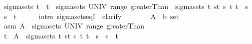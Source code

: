 \begin{isabellebody}
\ {\isachardoublequoteopen}sigma{\isacharunderscore}{\kern0pt}sets\ {\isacharbraceleft}{\kern0pt}t\ {\isacharparenleft}{\kern0pt}{\isacharparenleft}{\kern0pt}{\isasyminter}{\isacharparenright}{\kern0pt}\ {\isacharbraceleft}{\kern0pt}t\ {\isacharbackquote}{\kern0pt}\ sigma{\isacharunderscore}{\kern0pt}sets\ UNIV\ {\isacharparenleft}{\kern0pt}range\ greaterThan{\isacharparenright}{\kern0pt}{\isacharparenright}{\kern0pt}\ {\isacharequal}{\kern0pt}\ sigma{\isacharunderscore}{\kern0pt}sets\ {\isacharbraceleft}{\kern0pt}t\ {\isacharbraceleft}{\kern0pt}{\isacharbraceleft}{\kern0pt}s{\isacharless}{\kern0pt}{\isachardot}{\kern0pt}{\isachardot}{\kern0pt}t{\isacharbraceright}{\kern0pt}\ {\isacharbar}{\kern0pt}s\ t{\isachardot}{\kern0pt}\ t\ {\isasymle}\ s\ {\isasymand}\ s\ {\isacharless}{\kern0pt}\ t{\isacharbraceright}{\kern0pt}{\isachardoublequoteclose}\isanewline
\ \ \ \ \isamarkupfalse%
\ {\isacharparenleft}{\kern0pt}intro\ sigma{\isacharunderscore}{\kern0pt}sets{\isacharunderscore}{\kern0pt}eqI\ {\isacharsemicolon}{\kern0pt}\ clarify{\isacharparenright}{\kern0pt}\isanewline
\ \ \ \ \ \ \isamarkupfalse%
\ A\ {\isacharcolon}{\kern0pt}{\isacharcolon}{\kern0pt}\ {\isachardoublequoteopen}{\isacharprime}{\kern0pt}b\ set{\isachardoublequoteclose}\ \isamarkupfalse%
\ asm{\isacharcolon}{\kern0pt}\ {\isachardoublequoteopen}A\ {\isasymin}\ sigma{\isacharunderscore}{\kern0pt}sets\ UNIV\ {\isacharparenleft}{\kern0pt}range\ greaterThan{\isacharparenright}{\kern0pt}{\isachardoublequoteclose}\isanewline
\ \ \ \ \ \ \isamarkupfalse%
\ {\isachardoublequoteopen}{\isacharbraceleft}{\kern0pt}t\ {\isasyminter}\ A\ {\isasymin}\ sigma{\isacharunderscore}{\kern0pt}sets\ {\isacharbraceleft}{\kern0pt}t\ {\isacharbraceleft}{\kern0pt}{\isacharbraceleft}{\kern0pt}s{\isacharless}{\kern0pt}{\isachardot}{\kern0pt}{\isachardot}{\kern0pt}t{\isacharbraceright}{\kern0pt}\ {\isacharbar}{\kern0pt}s\ t{\isachardot}{\kern0pt}\ t\ {\isasymle}\ s\ {\isasymand}\ s\ {\isacharless}{\kern0pt}\ t{\isacharbraceright}{\kern0pt}{\isachardoublequoteclose}\isanewline

\end{isabellebody}
